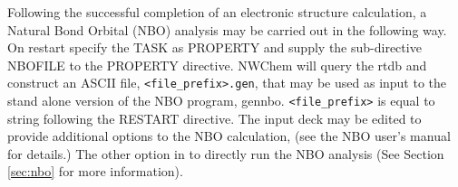 Following the successful completion of an electronic structure
calculation, a Natural Bond Orbital (NBO) analysis may be carried out
in the following way.  On restart specify the TASK as PROPERTY and
supply the sub-directive NBOFILE to the PROPERTY directive.  NWChem
will query the rtdb and construct an ASCII file,
\verb+<file_prefix>.gen+, that may be used as input to the stand alone
version of the NBO program, gennbo.  \verb+<file_prefix>+ is equal to
string following the RESTART directive.  The input deck may be edited
to provide additional options to the NBO calculation, (see the NBO
user's manual for details.)  The other option in to directly run the NBO 
analysis (See Section \ref{sec:nbo} for more information).

